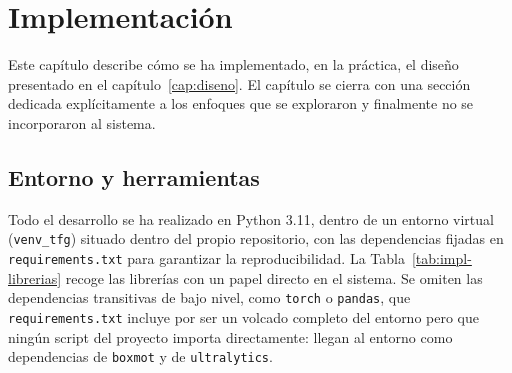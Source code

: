 \chapter{Implementación}
\label{cap:implementacion}

Este capítulo describe cómo se ha implementado, en la práctica, el diseño
presentado en el capítulo~\ref{cap:diseno}. El capítulo se cierra con una sección
dedicada explícitamente a los enfoques que se exploraron y finalmente no se
incorporaron al sistema.

\section{Entorno y herramientas}
\label{sec:implementacion-entorno}

Todo el desarrollo se ha realizado en Python 3.11, dentro de un entorno
virtual (\texttt{venv\_tfg}) situado dentro del propio repositorio, con las
dependencias fijadas en
\texttt{requirements.txt} para garantizar la reproducibilidad.
La Tabla~\ref{tab:impl-librerias} recoge las librerías con un papel directo
en el sistema. Se omiten las dependencias transitivas de bajo nivel, como
\texttt{torch} o \texttt{pandas}, que \texttt{requirements.txt} incluye por
ser un volcado completo del entorno pero que ningún
script del proyecto importa directamente: llegan al entorno como
dependencias de \texttt{boxmot} y de \texttt{ultralytics}.

\clearpage

